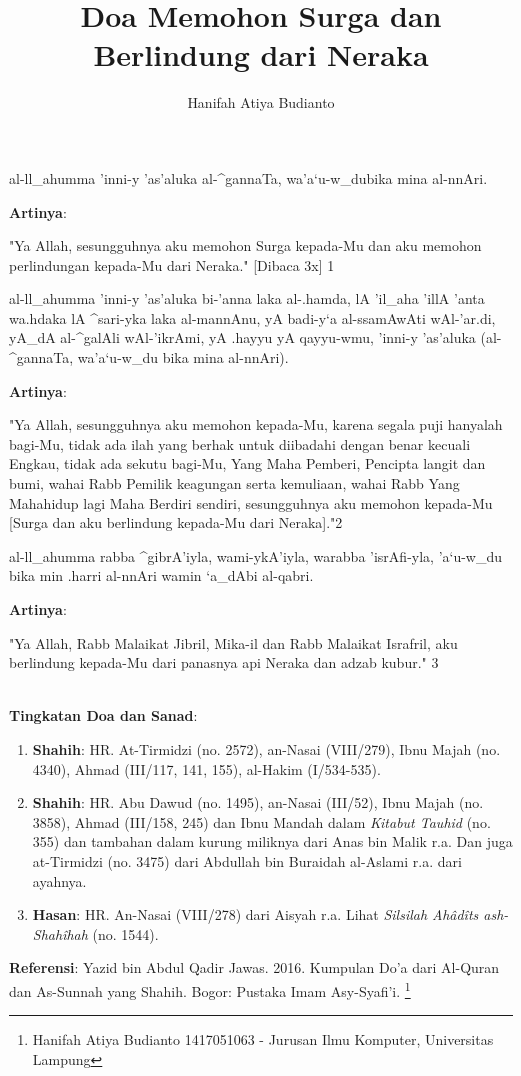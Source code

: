 \documentclass[a4paper,12pt]{article}
\title{\Large Doa Memohon Surga dan Berlindung dari Neraka}
\author{\calligra Hanifah Atiya Budianto}
\begin{document}
\sffamily
\maketitle 
\fullvocalize
{}
\begin{arabtext}
\noindent
al-ll_ahumma 'inni-y 'as'aluka al-^gannaTa, wa'a`u-w_dubika mina al-nnAri.
\\
\end{arabtext}
\noindent
\textbf{Artinya}:
\par
\indent
"Ya Allah, sesungguhnya aku memohon Surga kepada-Mu dan aku memohon 
perlindungan kepada-Mu dari Neraka." [Dibaca 3x] {\scriptsize 1}\\
\begin{arabtext}
\noindent
al-ll_ahumma 'inni-y 'as'aluka bi-'anna laka al-.hamda, lA 'il_aha 'illA 
'anta wa.hdaka lA ^sari-yka laka al-mannAnu, yA badi-y`a al-ssamAwAti 
wAl-'ar.di, yA_dA al-^galAli wAl-'ikrAmi, yA .hayyu yA qayyu-wmu, 'inni-y 
'as'aluka (al-^gannaTa, wa'a`u-w_du bika mina al-nnAri).\\
\end{arabtext}
\noindent
\textbf{Artinya}:
\par
\indent
"Ya Allah, sesungguhnya aku memohon kepada-Mu, karena segala puji hanyalah 
bagi-Mu, tidak ada ilah yang berhak untuk diibadahi dengan benar kecuali 
Engkau, tidak ada sekutu bagi-Mu, Yang Maha Pemberi, Pencipta langit dan 
bumi, wahai Rabb Pemilik keagungan serta kemuliaan, wahai Rabb Yang 
Mahahidup lagi Maha Berdiri sendiri, sesungguhnya aku memohon kepada-Mu 
[Surga dan aku berlindung kepada-Mu dari Neraka]."{\scriptsize 2}\\
\begin{arabtext}
\noindent
al-ll_ahumma rabba ^gibrA'iyla, wami-ykA'iyla, warabba 'isrAfi-yla, 
'a`u-w_du bika min .harri al-nnAri wamin `a_dAbi al-qabri.\\
\end{arabtext}
\noindent
\textbf{Artinya}:
\par
\indent
"Ya Allah, Rabb Malaikat Jibril, Mika-il dan Rabb Malaikat Israfril, aku 
berlindung kepada-Mu dari panasnya api Neraka dan adzab kubur."
{\scriptsize 3}\\\\
\par
\noindent
\textbf{Tingkatan Doa dan Sanad}:
\begin{enumerate}
\item \textbf{Shahih}: HR. At-Tirmidzi (no. 2572), an-Nasai (VIII/279), 
Ibnu Majah (no. 4340), Ahmad (III/117, 141, 155), al-Hakim (I/534-535).
\item \textbf{Shahih}: HR. Abu Dawud (no. 1495), an-Nasai (III/52), Ibnu 
Majah (no. 3858), Ahmad (III/158, 245) dan Ibnu Mandah dalam 
\textit{Kitabut Tauhid} (no. 355) dan tambahan dalam kurung miliknya dari 
Anas bin Malik r.a. Dan juga at-Tirmidzi (no. 3475) dari Abdullah bin 
Buraidah al-Aslami r.a. dari ayahnya.
\item \textbf{Hasan}: HR. An-Nasai (VIII/278) dari Aisyah r.a. Lihat 
\textit{Silsilah Ah\^{a}d\^{i}ts ash-Shah\^{i}hah} (no. 1544).
\end{enumerate}
\textbf{Referensi}: Yazid bin Abdul Qadir Jawas. 2016. Kumpulan Do'a dari
Al-Quran dan As-Sunnah yang Shahih. Bogor: Pustaka Imam Asy-Syafi'i.
\footnote{Hanifah Atiya Budianto 1417051063 - Jurusan Ilmu Komputer,
Universitas Lampung}
\end{document}
